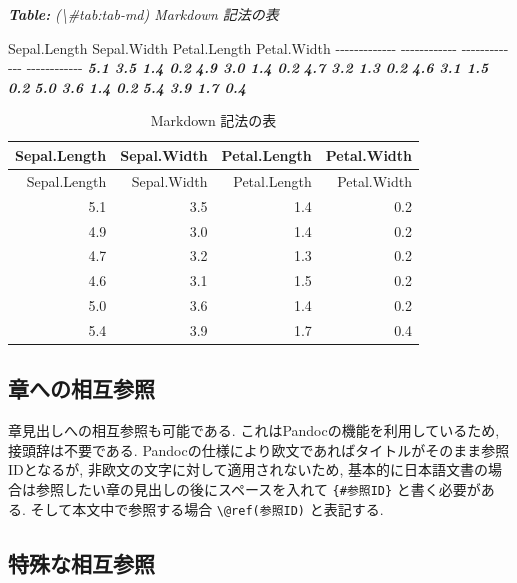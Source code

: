 \documentclass[
]{bxjsbook}
\newenvironment{Shaded}{\begin{snugshade}}{\end{snugshade}}
\newcommand{\AnnotationTok}[1]{\textcolor[rgb]{0.56,0.35,0.01}{\textbf{\textit{#1}}}}
\newcommand{\CommentTok}[1]{\textcolor[rgb]{0.56,0.35,0.01}{\textit{#1}}}
\newcommand{\InformationTok}[1]{\textcolor[rgb]{0.56,0.35,0.01}{\textbf{\textit{#1}}}}
\newcommand{\NormalTok}[1]{#1}
\theoremstyle{definition}
\theoremstyle{definition}
\theoremstyle{definition}
\theoremstyle{remark}
\begin{document}
\begin{Shaded}
\begin{Highlighting}[]
\AnnotationTok{Table:}\CommentTok{ (\textbackslash{}\#tab:tab{-}md) Markdown 記法の表}

\NormalTok{ Sepal.Length   Sepal.Width   Petal.Length   Petal.Width}
\NormalTok{{-}{-}{-}{-}{-}{-}{-}{-}{-}{-}{-}{-}{-}  {-}{-}{-}{-}{-}{-}{-}{-}{-}{-}{-}{-}  {-}{-}{-}{-}{-}{-}{-}{-}{-}{-}{-}{-}{-}  {-}{-}{-}{-}{-}{-}{-}{-}{-}{-}{-}{-}}
\InformationTok{          5.1           3.5            1.4           0.2}
\InformationTok{          4.9           3.0            1.4           0.2}
\InformationTok{          4.7           3.2            1.3           0.2}
\InformationTok{          4.6           3.1            1.5           0.2}
\InformationTok{          5.0           3.6            1.4           0.2}
\InformationTok{          5.4           3.9            1.7           0.4}
\end{Highlighting}
\end{Shaded}

\begin{longtable}[]{@{}rrrr@{}}
\caption{\label{tab:tab-md} Markdown 記法の表}\tabularnewline
\toprule
Sepal.Length & Sepal.Width & Petal.Length & Petal.Width\tabularnewline
\midrule
\endfirsthead
\toprule
Sepal.Length & Sepal.Width & Petal.Length & Petal.Width\tabularnewline
\midrule
\endhead
5.1 & 3.5 & 1.4 & 0.2\tabularnewline
4.9 & 3.0 & 1.4 & 0.2\tabularnewline
4.7 & 3.2 & 1.3 & 0.2\tabularnewline
4.6 & 3.1 & 1.5 & 0.2\tabularnewline
5.0 & 3.6 & 1.4 & 0.2\tabularnewline
5.4 & 3.9 & 1.7 & 0.4\tabularnewline
\bottomrule
\end{longtable}

\hypertarget{ux7ae0ux3078ux306eux76f8ux4e92ux53c2ux7167}{%
\subsection{章への相互参照}\label{ux7ae0ux3078ux306eux76f8ux4e92ux53c2ux7167}}

章見出しへの相互参照も可能である. これはPandocの機能を利用しているため,
接頭辞は不要である.
Pandocの仕様により欧文であればタイトルがそのまま参照IDとなるが,
非欧文の文字に対して適用されないため,
基本的に日本語文書の場合は参照したい章の見出しの後にスペースを入れて
\texttt{\{\#参照ID\}} と書く必要がある. そして本文中で参照する場合
\texttt{\textbackslash{}@ref(参照ID)} と表記する.

\hypertarget{ux7279ux6b8aux306aux76f8ux4e92ux53c2ux7167}{%
\subsection{特殊な相互参照}\label{ux7279ux6b8aux306aux76f8ux4e92ux53c2ux7167}}
\end{document}
